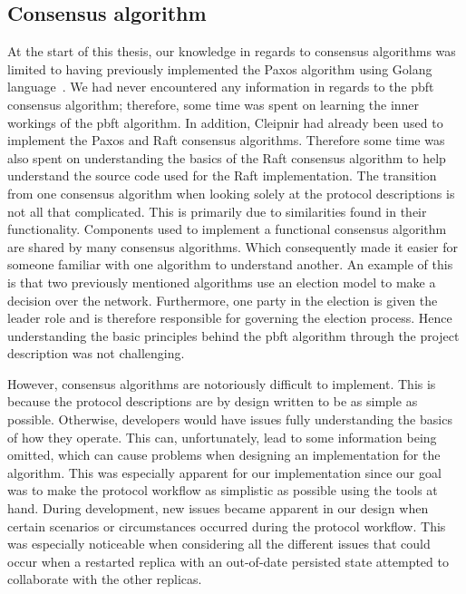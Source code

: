 \subsection{Consensus algorithm}

At the start of this thesis, our knowledge in regards to consensus algorithms was limited to having previously implemented the Paxos algorithm using Golang language~\cite{WEB:golangmainpage}. We had never encountered any information in regards to the \ac{pbft} consensus algorithm; therefore, some time was spent on learning the inner workings of the \ac{pbft} algorithm. In addition, Cleipnir had already been used to implement the Paxos and Raft consensus algorithms. Therefore some time was also spent on understanding the basics of the Raft consensus algorithm to help understand the source code used for the Raft implementation. The transition from one consensus algorithm when looking solely at the protocol descriptions is not all that complicated. This is primarily due to similarities found in their functionality. Components used to implement a functional consensus algorithm are shared by many consensus algorithms. Which consequently made it easier for someone familiar with one algorithm to understand another.
An example of this is that two previously mentioned algorithms use an election model to make a decision over the network. Furthermore, one party in the election is given the leader role and is therefore responsible for governing the election process. Hence understanding the basic principles behind the \ac{pbft} algorithm through the project description was not challenging.

However, consensus algorithms are notoriously difficult to implement. This is because the protocol descriptions are by design written to be as simple as possible. Otherwise, developers would have issues fully understanding the basics of how they operate. This can, unfortunately, lead to some information being omitted, which can cause problems when designing an implementation for the algorithm. This was especially apparent for our implementation since our goal was to make the protocol workflow as simplistic as possible using the tools at hand. During development, new issues became apparent in our design when certain scenarios or circumstances occurred during the protocol workflow. This was especially noticeable when considering all the different issues that could occur when a restarted replica with an out-of-date persisted state attempted to collaborate with the other replicas.

